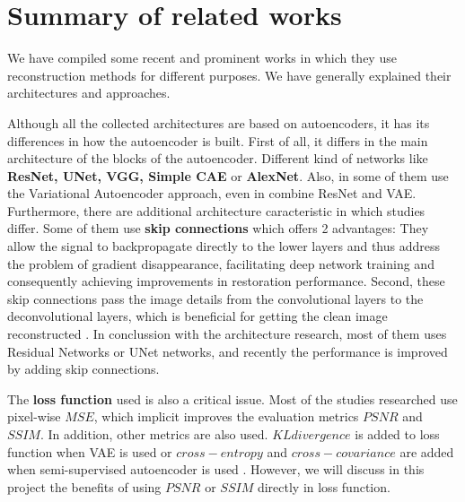 


\section{Summary of related works}

We have compiled some recent and prominent works in which they use reconstruction methods for different purposes. We have generally explained their architectures and approaches.

Although all the collected architectures are based on autoencoders, it has its differences in how the autoencoder is built. First of all, it differs in the main architecture of the blocks of the autoencoder. Different kind of networks like \textbf{ResNet, UNet, VGG, Simple CAE} or \textbf{AlexNet}. Also, in some of them use the Variational Autoencoder approach, even in \cite{myronenko20183d} combine ResNet and VAE. 
Furthermore, there are additional architecture caracteristic in which studies differ. Some of them use \textbf{skip connections} which offers 2 advantages: They allow the signal to backpropagate directly to the lower layers and thus address the problem of gradient disappearance, facilitating deep network training and consequently achieving improvements in restoration performance. Second, these skip connections pass the image details from the convolutional layers to the deconvolutional layers, which is beneficial for getting the clean image reconstructed \cite{superresolution}. In conclussion with the architecture research, most of them uses Residual Networks or UNet networks, and recently the performance is improved by adding skip connections.

The \textbf{loss function} used is also a critical issue. Most of the studies researched use pixel-wise $MSE$, which implicit improves the evaluation metrics $PSNR$ and $SSIM$. In addition, other metrics are also used. $KL divergence$ is added to loss function when VAE is used or $cross-entropy$ and $cross-covariance$ are added when semi-supervised autoencoder is used \cite{pinaya2019}. However, we will discuss in this project the benefits of using $PSNR$ or $SSIM$ directly in loss function. 

